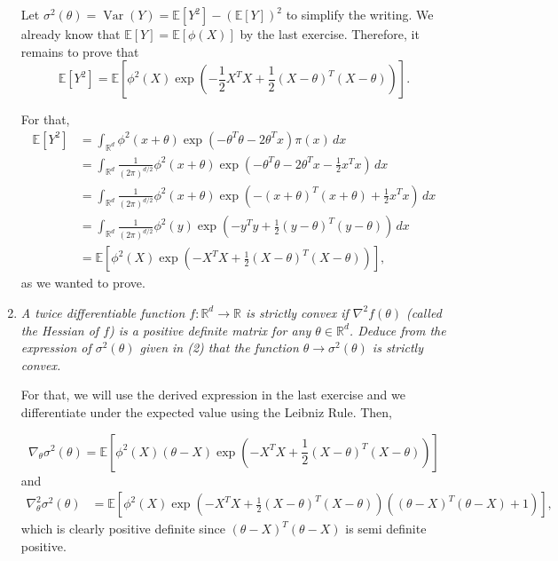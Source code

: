 \documentclass[a4paper,12pt]{article}
\newcommand{\R}{\mathbb{R}}
\newcommand{\var}{\operatorname{Var}}
\newcommand{\ev}{\mathbb{E}}
\theoremstyle{definition}
\begin{document}
\begin{enumerate}
    Let $\sigma^2(\theta) = \var(Y) = \ev[Y^2] - (\ev[Y])^2$ to 
    simplify the writing. We already know that $\ev[Y] = \ev[\phi(X)]$
    by the last exercise. Therefore, it remains to prove that 
    $$
    \ev[Y^2] =  \ev\left[\phi^2(X) \exp\left(-\frac{1}{2}X^TX +
    \frac{1}{2}(X-\theta)^T(X-\theta)\right)\right].
    $$

    For that, 
    \begin{equation*}
        \begin{split}
            \ev[Y^2] &= \int_{\R^d} \phi^2(x+\theta)\exp\left(-\theta^T\theta - 
            2\theta^Tx\right) \pi(x) \, dx \\
            &= \int_{\R^d} \frac{1}{(2\pi)^{d/2}}\phi^2(x+\theta)\exp\left(-\theta^T\theta - 
            2\theta^Tx - \frac{1}{2}x^Tx\right) \, dx \\
            &= \int_{\R^d} \frac{1}{(2\pi)^{d/2}}\phi^2(x+\theta)\exp\left(-(x + \theta)^T(x + \theta)
            + \frac{1}{2}x^Tx\right) \, dx \\
            &= \int_{\R^d} \frac{1}{(2\pi)^{d/2}}\phi^2(y)\exp\left(-y^Ty
            + \frac{1}{2}(y - \theta)^T(y - \theta)\right) \, dx \\
            &= \ev\left[\phi^2(X) \exp\left(-X^TX +
            \frac{1}{2}(X-\theta)^T(X-\theta)\right)\right],
        \end{split}
    \end{equation*}
    as we wanted to prove. 

    \item {\it A twice differentiable function $f : \R^d \to \R$ is 
    strictly convex if $\nabla^2 f (\theta)$ (called the Hessian of 
    $f$) is a positive definite matrix for any $\theta \in \R^d$. 
    Deduce from the expression of $\sigma^2(\theta)$ given in 
    (2) that the function $\theta \to \sigma^2(\theta)$ is strictly 
    convex.}

    For that, we will use the derived expression in the last exercise
    and we differentiate under the expected value using the Leibniz 
    Rule. Then, 

    \begin{equation*}
        \nabla_{\theta} \sigma^2(\theta) = \ev\left[\phi^2(X)(\theta-X)\exp\left(-X^TX +
        \frac{1}{2}(X-\theta)^T(X-\theta)\right)\right]
    \end{equation*}
    and 
    \begin{equation*}
        \begin{split}
            \nabla^2_{\theta} \sigma^2(\theta) &= \ev\left[\phi^2(X)\exp\left(-X^TX +
        \frac{1}{2}(X-\theta)^T(X-\theta)\right)((\theta - X)^T(\theta - X) + 1)\right], 
        \end{split}
    \end{equation*}
    which is clearly positive definite since $(\theta -X)^T(\theta-X)$ 
    is semi definite positive.


\end{enumerate}
\end{document}

